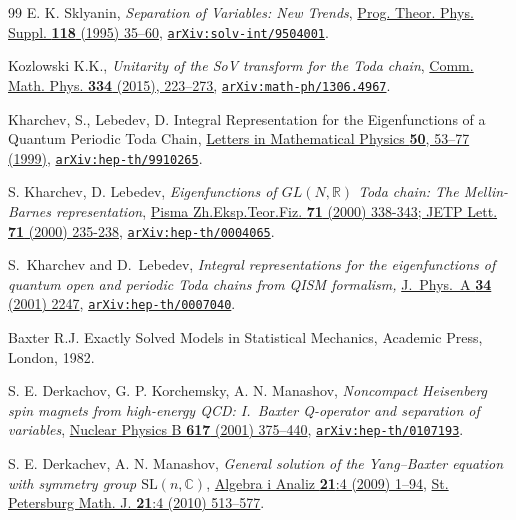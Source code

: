 \documentclass[a4paper,11pt]{article}
\numberwithin{equation}{section}
\begin{document}
\begin{thebibliography}{99}
 E. K. Sklyanin, \textit{Separation of Variables: New Trends}, \href{https://doi.org/10.1143/PTPS.118.35}{Prog. Theor. Phys. Suppl. \textbf{118} (1995) 35--60}, \href{https://arxiv.org/abs/solv-int/9504001}{\texttt{arXiv:solv-int/9504001}}.

Kozlowski K.K., \textit{Unitarity of the SoV transform for the Toda chain},
\href{https://link.springer.com/article/10.1007/s00220-014-2134-6}{Comm. Math. Phys. \textbf{334} (2015), 223--273,}
\href{https://doi.org/10.1007/s00220-014-2134-6/arXiv.math-ph/1306.4967}
{\texttt{\href{https://arxiv.org/abs/math-ph/1306.4967}{\texttt{arXiv:math-ph/1306.4967}}}}.  

Kharchev, S., Lebedev, D. Integral Representation for the Eigenfunctions of a Quantum Periodic Toda Chain,
\href{https://doi.org/10.1023/A:1007679024609}{Letters in Mathematical Physics \textbf{50}, 53--77 (1999)}, \href{https://arxiv.org/abs/hep-th/9910265}{\texttt{arXiv:hep-th/9910265}}.

 S. Kharchev, D. Lebedev,
\textit{Eigenfunctions of $GL(N,\mathbb{R})$ Toda chain: 
	The Mellin-Barnes representation},
\href{https://doi.org/10.1134/1.568323}{Pisma Zh.Eksp.Teor.Fiz. \textbf{71} (2000) 338-343; JETP Lett. \textbf{71} (2000) 235-238},
\href{https://doi.org/10.48550/arXiv.hep-th/0004065}
{\texttt{\href{https://arxiv.org/abs/hep-th/0004065}{\texttt{arXiv:hep-th/0004065}}}}.

S.~Kharchev and D.~Lebedev,
\emph{Integral representations for the eigenfunctions of quantum open and periodic Toda chains from QISM formalism,}
\href{https://iopscience.iop.org/article/10.1088/0305-4470/34/11/317}{J.\ Phys.\ A {\bf 34} (2001) 2247},
\href{https://arxiv.org/abs/hep-th/0007040}{\texttt{arXiv:hep-th/0007040}}.


Baxter R.J. Exactly Solved Models in Statistical Mechanics, Academic
Press, London, 1982.


 S. E. Derkachov, G. P. Korchemsky, A. N. Manashov,
\textit{Noncompact Heisenberg spin magnets from high-energy QCD: I. Baxter Q-operator and separation of variables}, \href{https://doi.org/10.1016/S0550-3213(01)00457-6}{Nuclear Physics B \textbf{617} (2001) 375--440}, \href{https://arxiv.org/abs/hep-th/0107193}{\texttt{arXiv:hep-th/0107193}}.

S. E. Derkachev, A. N. Manashov, \textit{General solution of the Yang–Baxter equation with symmetry group $\mathrm{SL}(n,\mathbb{C})$}, \href{https://www.mathnet.ru/rus/aa1145}{Algebra i Analiz \textbf{21}:4 (2009) 1--94}, \href{https://doi.org/10.1090/S1061-0022-2010-01106-3}{St. Petersburg Math. J. \textbf{21}:4 (2010) 513--577}.


\end{thebibliography}
\end{document}
